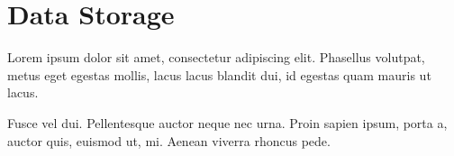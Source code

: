 \section{Data Storage}

Lorem ipsum dolor sit amet, consectetur adipiscing elit. Phasellus volutpat, metus eget egestas mollis, lacus lacus blandit dui, id egestas quam mauris ut lacus.

Fusce vel dui. Pellentesque auctor neque nec urna. Proin sapien ipsum, porta a, auctor quis, euismod ut, mi. Aenean viverra rhoncus pede.
